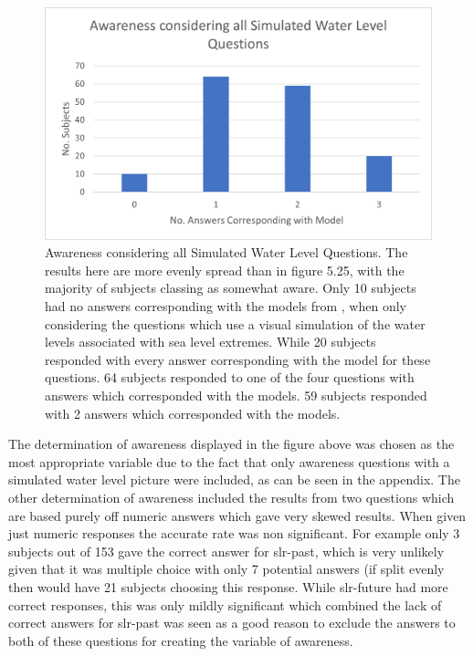 \begin{figure}[h!]
    \centering
    \includegraphics{fig_results/Awareness_ all_simulation_pictures_qs.png}
    \caption{Awareness considering all Simulated Water Level Questions. The results here are more evenly spread than in figure 5.25, with the majority of subjects classing as somewhat aware. Only 10 subjects had no answers corresponding with the models from \cite{kartverket_se_2020}, when only considering the questions which use a visual simulation of the water levels associated with sea level extremes. While 20 subjects responded with every answer corresponding with the model for these questions. 64 subjects responded to one of the four questions with answers which corresponded with the models. 59 subjects responded with 2 answers which corresponded with the models. }
    \label{fig:aware_all}
\end{figure}

The determination of awareness displayed in the figure above was chosen as the most appropriate variable due to the fact that only awareness questions with a simulated water level picture were included, as can be seen in the appendix. The other determination of awareness included the results from two questions which are based purely off numeric answers which gave very skewed results. When given just numeric responses the accurate rate was non significant. For example only 3 subjects out of 153 gave the correct answer for slr-past, which is very unlikely given that it was multiple choice with only 7 potential answers (if split evenly then would have 21 subjects choosing this response. While slr-future had more correct responses, this was only mildly significant which combined the lack of correct answers for slr-past was seen as a good reason to exclude the answers to both of these questions for creating the variable of awareness. 
